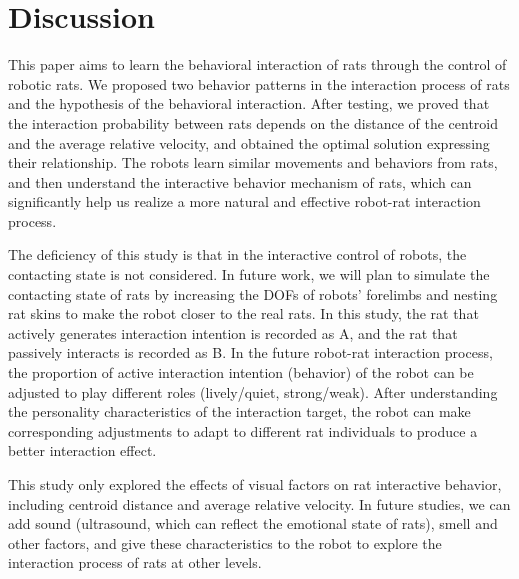 \section{Discussion}
This paper aims to learn the behavioral interaction of rats through the control of robotic rats. We proposed two behavior patterns in the interaction process of rats and the hypothesis of the behavioral interaction. After testing, we proved that the interaction probability between rats depends on the distance of the centroid and the average relative velocity, and obtained the optimal solution expressing their relationship. The robots learn similar movements and behaviors from rats, and then understand the interactive behavior mechanism of rats, which can significantly help us realize a more natural and effective robot-rat interaction process.

The deficiency of this study is that in the interactive control of robots, the contacting state is not considered. In future work, we will plan to simulate the contacting state of rats by increasing the DOFs of robots' forelimbs and nesting rat skins to make the robot closer to the real rats.
In this study, the rat that actively generates interaction intention is recorded as A, and the rat that passively interacts is recorded as B. In the future robot-rat interaction process, the proportion of active interaction intention (behavior) of the robot can be adjusted to play different roles (lively/quiet, strong/weak). After understanding the personality characteristics of the interaction target, the robot can make corresponding adjustments to adapt to different rat individuals to produce a better interaction effect.

This study only explored the effects of visual factors on rat interactive behavior, including centroid distance and average relative velocity. In future studies, we can add sound (ultrasound, which can reflect the emotional state of rats), smell and other factors, and give these characteristics to the robot to explore the interaction process of rats at other levels.
